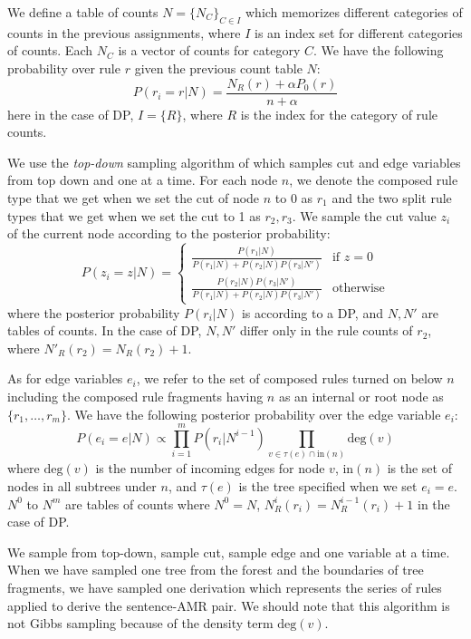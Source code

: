 We define a 
table of counts $N=\{N_C\}_{C\in I}$ which memorizes different categories of counts in 
the previous assignments, where $I$
is an index set for different categories of counts. Each $N_C$ is a vector of counts for category $C$. 
We have the following probability over rule $r$ given the previous count table $N$:
\begin{equation}
P(r_i = r| N) = \frac{N_R(r) + \alpha P_0 (r)}{n + \alpha }
\end{equation}
here in the case of DP, $I=\{R\}$, where $R$ is the index for the category of rule counts.


We use the {\em top-down} sampling algorithm of  which samples cut and edge variables from top down and one at a time.
For each node $n$, we denote the composed rule type
that we get when we set the cut of node $n$ to 0 as $r_1$ and the two 
split rule types that we get when we set the cut to 1 as $r_2, r_3$. We sample the cut value $z_i$ of the 
current node according to the posterior probability:
\begin{equation}
\label{eq:cut}
P(z_i = z| N) = 
\begin{cases} 
\frac{ P (r_1| N) }{P (r_1|N) + P (r_2| N) P (r_3| N') } &\mbox{if } z = 0 \\ 
\frac{ P (r_2| N) P (r_3| N') }{P (r_1| N)+ P (r_2| N) P (r_3| N') } &\mbox{otherwise}
\end{cases}
\end{equation}
where the posterior probability $P(r_i|N)$ is according to a DP, 
and $N, N'$ are tables of 
counts. In the case of DP, $N, N'$ differ only in the rule counts of $r_2$, where $N'_R(r_2)= 
N_R(r_2)+1$.


As for edge variables $e_i$, we refer to the set of composed rules turned on below $n$ including the 
composed rule fragments having $n$ as an internal or root node as $\{r_1,\ldots,r_m\}$. We have the 
following posterior probability over the edge variable $e_i$:
\begin{equation}
P(e_i = e| N) \propto \prod_{i=1}^m P(r_i| N^{i-1}) \prod_{v \in \tau(e)\cap \mbox{in}(n)} \mbox{deg}(v)
\end{equation}
where $\mbox{deg}(v)$ is the number of incoming edges for node $v$, 
$\mbox{in}(n)$ is the set of nodes 
in all subtrees under $n$, and $\tau(e)$ is the tree specified when we set $e_i = e$. $N^0$ to $N^m$ 
are tables of counts where $N^0 = N$, $N^i_R(r_i) = N^{i-1}_R(r_i) + 1$ in the case of DP.


We sample from top-down, sample cut, sample edge and one variable at a time. When we have sampled one tree from the forest
and the boundaries of tree fragments, we have sampled one derivation which represents the series of rules applied to derive
the sentence-AMR pair. We should note that this algorithm is not Gibbs sampling because of the density term $\mbox{deg}(v)$.

